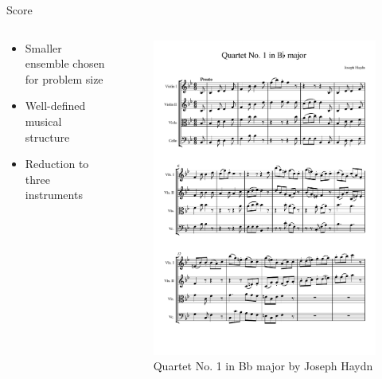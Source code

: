 \documentclass[handout]{beamer}
\begin{document}
\begin{frame}{Score}

    \begin{columns}
        \begin{column}{.5\textwidth}
            \begin{itemize}
                \item Smaller ensemble chosen for problem size
                \item Well-defined musical structure
                \item Reduction to three instruments
            \end{itemize}
        \end{column}
        \begin{column}{.5\textwidth}
            \begin{figure}
                \includegraphics[width=\textwidth, page=1]{haydn.pdf}
                \caption{Quartet No. 1 in Bb major by Joseph Haydn}
            \end{figure}
        \end{column}
    \end{columns}
    

\end{frame}
\end{document}
